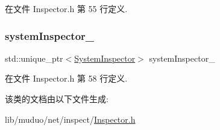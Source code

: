 在文件 Inspector.\+h 第 55 行定义.

\mbox{\label{classmuduo_1_1net_1_1Inspector_a538656ca5a8c83dc0b19a638118d6d24}} 
\subsubsection{\texorpdfstring{system\+Inspector\+\_\+}{systemInspector\_}}
{\footnotesize\ttfamily std\+::unique\+\_\+ptr$<$\hyperlink{classmuduo_1_1net_1_1SystemInspector}{System\+Inspector}$>$ system\+Inspector\+\_\+\hspace{0.3cm}{\ttfamily [private]}}



在文件 Inspector.\+h 第 58 行定义.



该类的文档由以下文件生成\+:\begin{DoxyCompactItemize}
\item 
lib/muduo/net/inspect/\hyperlink{Inspector_8h}{Inspector.\+h}\end{DoxyCompactItemize}

